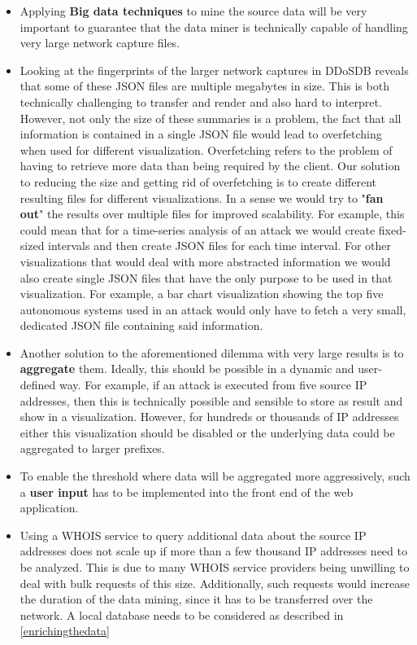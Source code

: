     \begin{itemize}
    \item     Applying \textbf{Big data techniques} to mine the source data will be very important to guarantee that the data miner is technically capable of handling very large network capture files.
\item Looking at the fingerprints of the larger network captures in DDoSDB reveals that some of these JSON files are multiple megabytes in size. This is both technically challenging to transfer and render and also hard to interpret. However, not only the size of these summaries is a problem, the fact that all information is contained in a single JSON file would lead to overfetching when used for different visualization. Overfetching refers to the problem of having to retrieve more data than being required by the client. Our solution to reducing the size and getting rid of overfetching is to create different resulting files for different visualizations. In a sense we would try to "\textbf{fan out}" the results over multiple files for improved scalability. For example, this could mean that for a time-series analysis of an attack we would create fixed-sized intervals and then create JSON files for each time interval. For other visualizations that would deal with more abstracted information we would also create single JSON files that have the only purpose to be used in that visualization. For example, a bar chart visualization showing the top five autonomous systems used in an attack would only have to fetch a very small, dedicated JSON file containing said information.
\item Another solution to the aforementioned dilemma with very large results is to \textbf{aggregate} them. Ideally, this should be possible in a dynamic and user-defined way. For example, if an attack is executed from five source IP addresses, then this is technically possible and sensible to store as result and show in a visualization. However, for hundreds or thousands of IP addresses either this visualization should be disabled or the underlying data could be aggregated to larger prefixes.
\item To enable the threshold where data will be aggregated more aggressively, such a \textbf{user input} has to be implemented into the front end of the web application.
\item Using a WHOIS service to query additional data about the source IP addresses does not scale up if more than a few thousand IP addresses need to be analyzed. This is due to many WHOIS service providers being unwilling to deal with bulk requests of this size. Additionally, such requests would increase the duration of the data mining, since it has to be transferred over the network. A local database needs to be considered as described in \ref{enrichingthedata}
\end{itemize}
    

